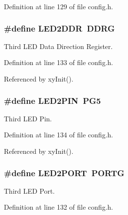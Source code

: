 Definition at line 129 of file config.\-h.

\hypertarget{group__config_ga7e635626ee31b094da0a668476132577}{
\subsubsection[{L\-E\-D2\-D\-D\-R}]{\setlength{\rightskip}{0pt plus 5cm}\#define L\-E\-D2\-D\-D\-R~D\-D\-R\-G}}\label{group__config_ga7e635626ee31b094da0a668476132577}


Third L\-E\-D Data Direction Register. 



Definition at line 133 of file config.\-h.



Referenced by xy\-Init().

\hypertarget{group__config_ga50070e632cb68d11f627c5ab60f88683}{
\subsubsection[{L\-E\-D2\-P\-I\-N}]{\setlength{\rightskip}{0pt plus 5cm}\#define L\-E\-D2\-P\-I\-N~P\-G5}}\label{group__config_ga50070e632cb68d11f627c5ab60f88683}


Third L\-E\-D Pin. 



Definition at line 134 of file config.\-h.



Referenced by xy\-Init().

\hypertarget{group__config_ga4b6e8cddebfbc6f1f5132eb93b92d60f}{
\subsubsection[{L\-E\-D2\-P\-O\-R\-T}]{\setlength{\rightskip}{0pt plus 5cm}\#define L\-E\-D2\-P\-O\-R\-T~P\-O\-R\-T\-G}}\label{group__config_ga4b6e8cddebfbc6f1f5132eb93b92d60f}


Third L\-E\-D Port. 



Definition at line 132 of file config.\-h.

